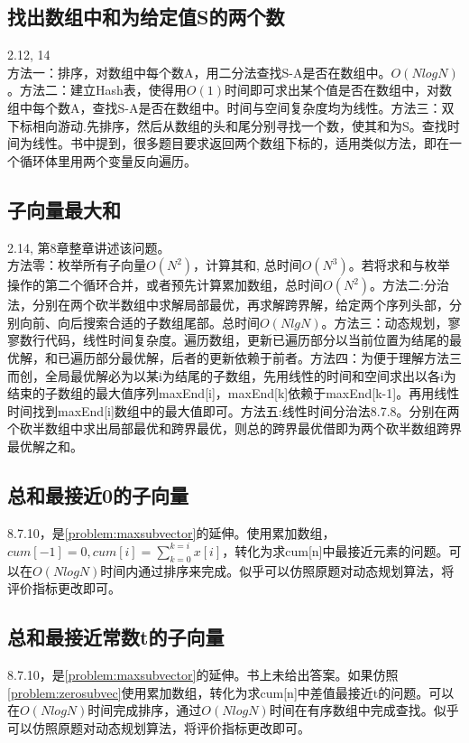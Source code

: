 \subsection{找出数组中和为给定值S的两个数}
\cite{bop}2.12, \cite{ms100}14\\
方法一：排序，对数组中每个数A，用二分法查找S-A是否在数组中。$O(NlogN)$。方法二：建立Hash表，使得用$O(1)$时间即可求出某个值是否在数组中，对数组中每个数A，查找S-A是否在数组中。时间与空间复杂度均为线性。方法三：双下标相向游动.先排序，然后从数组的头和尾分别寻找一个数，使其和为S。查找时间为线性。书中提到，很多题目要求返回两个数组下标的，适用类似方法，即在一个循环体里用两个变量反向遍历。

\subsection{子向量最大和}
\cite{bop}2.14, \cite{pp}第8章整章讲述该问题。\label{problem:maxsubvector}\\
方法零：枚举所有子向量$O(N^2)$，计算其和, 总时间$O(N^3)$。若将求和与枚举操作的第二个循环合并，或者预先计算累加数组，总时间$O(N^2)$。方法二:分治法，分别在两个砍半数组中求解局部最优，再求解跨界解，给定两个序列头部，分别向前、向后搜索合适的子数组尾部。总时间$O(NlgN)$。方法三：动态规划，寥寥数行代码，线性时间复杂度。遍历数组，更新已遍历部分以当前位置为结尾的最优解，和已遍历部分最优解，后者的更新依赖于前者。方法四：\cite{self}为便于理解方法三而创，全局最优解必为以某i为结尾的子数组，先用线性的时间和空间求出以各i为结束的子数组的最大值序列maxEnd[i]，maxEnd[k]依赖于maxEnd[k-1]。再用线性时间找到maxEnd[i]数组中的最大值即可。方法五:线性时间分治法\cite{pp}8.7.8。分别在两个砍半数组中求出局部最优和跨界最优，则总的跨界最优借即为两个砍半数组跨界最优解之和。
\label{subsec:maxsubsum}

\subsection{总和最接近0的子向量}
\cite{pp}8.7.10，是\ref{problem:maxsubvector}的延伸。使用累加数组，$cum[-1]=0,cum[i]=\sum_{k=0}^{k=i}{x[i]}$，转化为求cum[n]中最接近元素的问题。可以在$O(NlogN)$时间内通过排序来完成。似乎可以仿照原题对动态规划算法，将评价指标更改即可。\label{problem:zerosubvec}

\subsection{总和最接近常数t的子向量}
\cite{pp}8.7.10，是\ref{problem:maxsubvector}的延伸。书上未给出答案。如果仿照\ref{problem:zerosubvec}使用累加数组，转化为求cum[n]中差值最接近t的问题。可以在$O(NlogN)$时间完成排序，通过$O(NlogN)$时间在有序数组中完成查找。似乎可以仿照原题对动态规划算法，将评价指标更改即可。


